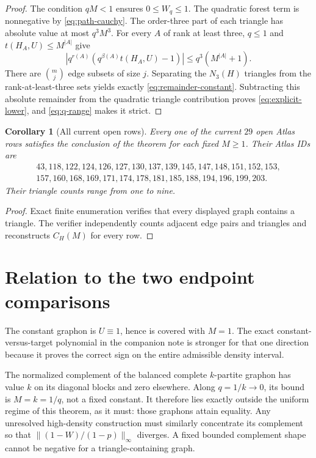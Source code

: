 \documentclass[11pt]{article}
\newtheorem{corollary}[theorem]{Corollary}
\begin{document}
\begin{proof}
The condition $qM<1$ ensures $0\leq W_q\leq1$.  The quadratic forest term
is nonnegative by \eqref{eq:path-cauchy}.  The order-three part of each
triangle has absolute value at most $q^3M^3$.  For every $A$ of rank at
least three, $q\leq1$ and $t(H_A,U)\leq M^{|A|}$ give
\[
 \left|q^{r(A)}
 \left(q^{\beta(A)}t(H_A,U)-1\right)\right|
 \leq q^3\left(M^{|A|}+1\right).
\]
There are $\binom mj$ edge subsets of size $j$.  Separating the
$N_3(H)$ triangles from the rank-at-least-three sets yields exactly
\eqref{eq:remainder-constant}.  Subtracting this absolute remainder from the
quadratic triangle contribution proves \eqref{eq:explicit-lower}, and
\eqref{eq:q-range} makes it strict.
\end{proof}

\begin{corollary}[All current open rows]
Every one of the current $29$ open Atlas rows satisfies the conclusion of
the theorem for each fixed $M\geq1$.  Their Atlas IDs are
\[
\begin{gathered}
43,118,122,124,126,127,130,137,139,145,147,148,151,152,153,\\
157,160,168,169,171,174,178,181,185,188,194,196,199,203.
\end{gathered}
\]
Their triangle counts range from one to nine.
\end{corollary}

\begin{proof}
Exact finite enumeration verifies that every displayed graph contains a
triangle.  The verifier independently counts adjacent edge pairs and
triangles and reconstructs $C_H(M)$ for every row.
\end{proof}

\section{Relation to the two endpoint comparisons}

The constant graphon is $U\equiv1$, hence is covered with $M=1$.  The exact
constant-versus-target polynomial in the companion note is stronger for that
one direction because it proves the correct sign on the entire admissible
density interval.

The normalized complement of the balanced complete $k$-partite graphon has
value $k$ on its diagonal blocks and zero elsewhere.  Along
$q=1/k\to0$, its bound is $M=k=1/q$, not a fixed constant.  It therefore
lies exactly outside the uniform regime of this theorem, as it must: those
graphons attain equality.  Any unresolved high-density construction must
similarly concentrate its complement so that
$\|(1-W)/(1-p)\|_\infty$ diverges.  A fixed bounded complement shape cannot
be negative for a triangle-containing graph.
\end{document}
